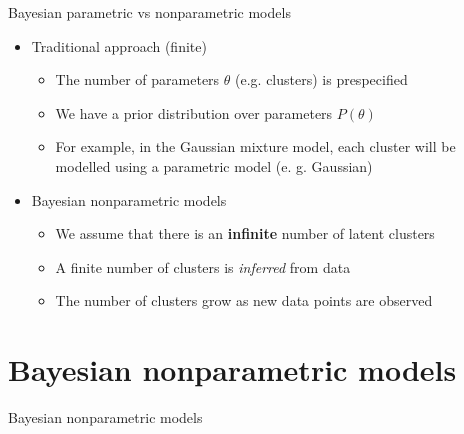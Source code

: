 \documentclass[handout]{beamer}
\begin{document}
\begin{frame}{Bayesian parametric vs nonparametric models}
    \begin{itemize}
        \item Traditional approach (finite)
           \begin{itemize}
               \item The number of parameters $\theta$ (e.g. clusters) is prespecified
               \item We have a prior distribution over parameters $P(\theta)$
               \item For example, in the Gaussian mixture model, each cluster will be modelled
                   using a parametric model (e. g. Gaussian)
           \end{itemize}
        \item Bayesian nonparametric models
           \begin{itemize}
               \item We assume that there is an \textbf{infinite} number of latent clusters
               \item A finite number of clusters is \textit{inferred} from data
               \item The number of clusters grow as new data points are observed
           \end{itemize}
    \end{itemize}
\end{frame}

\section{Bayesian nonparametric models}
\begin{frame}{Bayesian nonparametric models}

    \begin{figure}[H]
        \centering
        
    \end{figure}

\end{frame}
\end{document}

